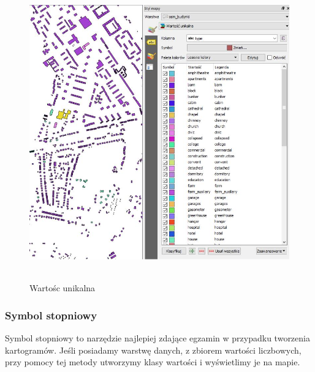 \documentclass[12pt,a4paper]{book}
\begin{document}
\begin{center}
\begin{figure}
\includegraphics[width=13cm,height=12.746cm]{007-wektor-unikalna.jpg}
\caption{Wartośc unikalna}
\end{figure}
\end{center}
\subsubsection{Symbol stopniowy}
Symbol stopniowy to narzędzie najlepiej zdające egzamin w przypadku tworzenia kartogramów. Jeśli posiadamy warstwę danych, z zbiorem wartości liczbowych, przy pomocy tej metody utworzymy klasy wartości i wyświetlimy je na mapie.
\end{document}
